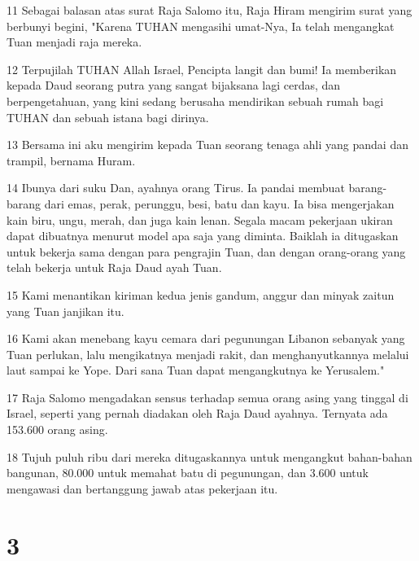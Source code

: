 \par 11 Sebagai balasan atas surat Raja Salomo itu, Raja Hiram mengirim surat yang berbunyi begini, "Karena TUHAN mengasihi umat-Nya, Ia telah mengangkat Tuan menjadi raja mereka.
\par 12 Terpujilah TUHAN Allah Israel, Pencipta langit dan bumi! Ia memberikan kepada Daud seorang putra yang sangat bijaksana lagi cerdas, dan berpengetahuan, yang kini sedang berusaha mendirikan sebuah rumah bagi TUHAN dan sebuah istana bagi dirinya.
\par 13 Bersama ini aku mengirim kepada Tuan seorang tenaga ahli yang pandai dan trampil, bernama Huram.
\par 14 Ibunya dari suku Dan, ayahnya orang Tirus. Ia pandai membuat barang-barang dari emas, perak, perunggu, besi, batu dan kayu. Ia bisa mengerjakan kain biru, ungu, merah, dan juga kain lenan. Segala macam pekerjaan ukiran dapat dibuatnya menurut model apa saja yang diminta. Baiklah ia ditugaskan untuk bekerja sama dengan para pengrajin Tuan, dan dengan orang-orang yang telah bekerja untuk Raja Daud ayah Tuan.
\par 15 Kami menantikan kiriman kedua jenis gandum, anggur dan minyak zaitun yang Tuan janjikan itu.
\par 16 Kami akan menebang kayu cemara dari pegunungan Libanon sebanyak yang Tuan perlukan, lalu mengikatnya menjadi rakit, dan menghanyutkannya melalui laut sampai ke Yope. Dari sana Tuan dapat mengangkutnya ke Yerusalem."
\par 17 Raja Salomo mengadakan sensus terhadap semua orang asing yang tinggal di Israel, seperti yang pernah diadakan oleh Raja Daud ayahnya. Ternyata ada 153.600 orang asing.
\par 18 Tujuh puluh ribu dari mereka ditugaskannya untuk mengangkut bahan-bahan bangunan, 80.000 untuk memahat batu di pegunungan, dan 3.600 untuk mengawasi dan bertanggung jawab atas pekerjaan itu.

\chapter{3}

